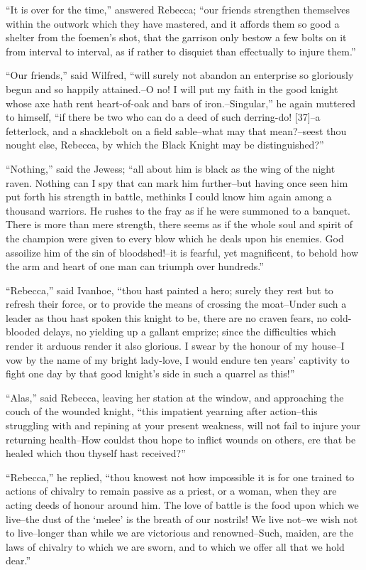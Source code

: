 ``It is over for the time,'' answered Rebecca; ``our friends strengthen
themselves within the outwork which they have mastered, and it affords
them so good a shelter from the foemen's shot, that the garrison only
bestow a few bolts on it from interval to interval, as if rather to
disquiet than effectually to injure them.''

``Our friends,'' said Wilfred, ``will surely not abandon an enterprise
so gloriously begun and so happily attained.--O no! I will put my faith
in the good knight whose axe hath rent heart-of-oak and bars of
iron.--Singular,'' he again muttered to himself, ``if there be two who
can do a deed of such derring-do! {[}37{]}--a fetterlock, and a
shacklebolt on a field sable--what may that mean?--seest thou nought
else, Rebecca, by which the Black Knight may be distinguished?''

``Nothing,'' said the Jewess; ``all about him is black as the wing of
the night raven. Nothing can I spy that can mark him further--but having
once seen him put forth his strength in battle, methinks I could know
him again among a thousand warriors. He rushes to the fray as if he were
summoned to a banquet. There is more than mere strength, there seems as
if the whole soul and spirit of the champion were given to every blow
which he deals upon his enemies. God assoilize him of the sin of
bloodshed!--it is fearful, yet magnificent, to behold how the arm and
heart of one man can triumph over hundreds.''

``Rebecca,'' said Ivanhoe, ``thou hast painted a hero; surely they rest
but to refresh their force, or to provide the means of crossing the
moat--Under such a leader as thou hast spoken this knight to be, there
are no craven fears, no cold-blooded delays, no yielding up a gallant
emprize; since the difficulties which render it arduous render it also
glorious. I swear by the honour of my house--I vow by the name of my
bright lady-love, I would endure ten years' captivity to fight one day
by that good knight's side in such a quarrel as this!''

``Alas,'' said Rebecca, leaving her station at the window, and
approaching the couch of the wounded knight, ``this impatient yearning
after action--this struggling with and repining at your present
weakness, will not fail to injure your returning health--How couldst
thou hope to inflict wounds on others, ere that be healed which thou
thyself hast received?''

``Rebecca,'' he replied, ``thou knowest not how impossible it is for one
trained to actions of chivalry to remain passive as a priest, or a
woman, when they are acting deeds of honour around him. The love of
battle is the food upon which we live--the dust of the `melee' is the
breath of our nostrils! We live not--we wish not to live--longer than
while we are victorious and renowned--Such, maiden, are the laws of
chivalry to which we are sworn, and to which we offer all that we hold
dear.''

